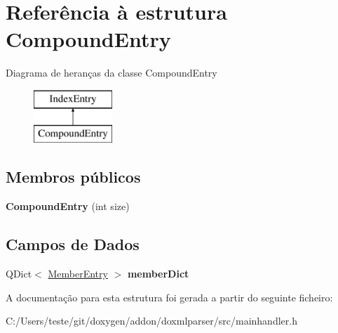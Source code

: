 \hypertarget{struct_compound_entry}{\section{Referência à estrutura Compound\-Entry}
\label{struct_compound_entry}
}
Diagrama de heranças da classe Compound\-Entry\begin{figure}[H]
\begin{center}
\leavevmode
\includegraphics[height=2.000000cm]{struct_compound_entry}
\end{center}
\end{figure}
\subsection*{Membros públicos}
\begin{DoxyCompactItemize}
\item 
\hypertarget{struct_compound_entry_adfbf2243b22c31c299482b71781e5102}{{\bfseries Compound\-Entry} (int size)}\label{struct_compound_entry_adfbf2243b22c31c299482b71781e5102}

\end{DoxyCompactItemize}
\subsection*{Campos de Dados}
\begin{DoxyCompactItemize}
\item 
\hypertarget{struct_compound_entry_af6992030f752ea5f105ed04e1bb1b140}{Q\-Dict$<$ \hyperlink{struct_member_entry}{Member\-Entry} $>$ {\bfseries member\-Dict}}\label{struct_compound_entry_af6992030f752ea5f105ed04e1bb1b140}

\end{DoxyCompactItemize}


A documentação para esta estrutura foi gerada a partir do seguinte ficheiro\-:\begin{DoxyCompactItemize}
\item 
C\-:/\-Users/teste/git/doxygen/addon/doxmlparser/src/mainhandler.\-h\end{DoxyCompactItemize}
